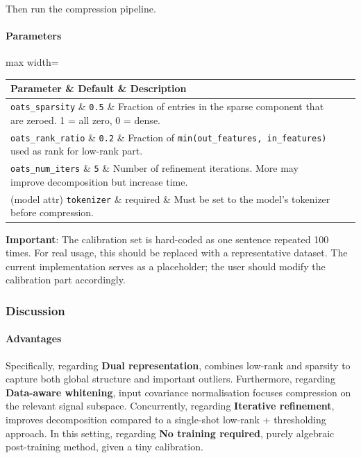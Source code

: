 Then run the compression pipeline.

\paragraph{Parameters}

\begin{center}
\begin{adjustbox}{max width=\columnwidth}
\renewcommand{\arraystretch}{1.2}
\begin{tabular}{lll}
\toprule
Parameter \& Default \& Description \\
\midrule
\texttt{oats\_sparsity} \& \texttt{0.5} \& Fraction of entries in the sparse component that are zeroed. 1 = all zero, 0 = dense. \\
\texttt{oats\_rank\_ratio} \& \texttt{0.2} \& Fraction of \texttt{min(out\_features, in\_features)} used as rank for low-rank part. \\
\texttt{oats\_num\_iters} \& \texttt{5} \& Number of refinement iterations. More may improve decomposition but increase time. \\
(model attr) \texttt{tokenizer} \& required \& Must be set to the model's tokenizer before compression. \\

\bottomrule
\end{tabular}
\end{adjustbox}
\end{center}
\textbf{Important}: The calibration set is hard-coded as one sentence repeated 100 times. For real usage, this should be replaced with a representative dataset. The current implementation serves as a placeholder; the user should modify the calibration part accordingly.


\subsubsection*{Discussion}

\paragraph{Advantages}

Specifically, regarding \textbf{Dual representation}, combines low-rank and sparsity to capture both global structure and important outliers. Furthermore, regarding \textbf{Data-aware whitening}, input covariance normalisation focuses compression on the relevant signal subspace. Concurrently, regarding \textbf{Iterative refinement}, improves decomposition compared to a single-shot low-rank + thresholding approach. In this setting, regarding \textbf{No training required}, purely algebraic post-training method, given a tiny calibration.


